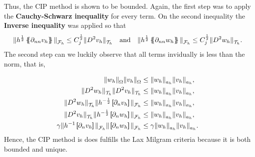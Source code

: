 Thus, the CIP method is shown to be bounded.
Again, the first step was to apply the \textbf{Cauchy-Schwarz inequality} for every term. On the second inequality the \textbf{Inverse inequality} was applied so that
\[
\| h^{\frac{1}{2}} \mean{ \partial _{nn}v_{h} }   \|_{ \mathcal{F} _{h}  }^{  }\le   C_{j}^{\frac{1}{2}} \| D ^2 v_{h} \|_{ \mathcal{T} _{h} }^{  } \quad \text{and} \quad   \| h^{\frac{1}{2}} \mean{ \partial _{nn}w_{h} }   \|_{ \mathcal{F} _{h}
}^{  }\le   C_{j}^{\frac{1}{2}} \| D ^2 w_{h} \|_{ \mathcal{T} _{h} }^{  }.
\]
The second step can we luckily observe that all terms invidually is less than the norm, that is,

\begin{equation}
\label{eq:bounded_ineq}
\begin{split}
\| w_{h} \|_{\Omega    }^{  }  \| v_{h} \|_{ \Omega    }^{  } & \le \| w_{h} \|_{ a_{h} }^{  } \| v_{h} \|_{ a_{h} }^{  }, \\
\| D ^2w_{h} \|_{\mathcal{T}_{h}   }^{  }  \| D ^2v_{h} \|_{\mathcal{T}_{h}   }^{  } & \le \| w_{h} \|_{ a_{h} }^{  } \| v_{h} \|_{ a_{h} }^{  }, \\
\|  D ^2 w_{h} \|_{ \mathcal{T} _{h} }^{ } \| h^{-\frac{1}{2}} \jump{ \partial _{n} v_{h} }   \|_{ \mathcal{F} _{h} }^{  }  & \le  \| w_{h} \|_{ a_{h} }^{  } \| v_{h} \|_{ a_{h} }^{  }, \\
   \|  D ^2 v_{h} \|_{ \mathcal{T} _{h} }^{ } \| h^{-\frac{1}{2}} \jump{ \partial _{n} w_{h} }   \|_{ \mathcal{F} _{h} }^{  }   & \le \| w_{h} \|_{ a_{h} }^{  } \| v_{h} \|_{ a_{h} }^{  }, \\
 \gamma \| h^{-1 } \jump{ \partial _{n} v_{h} }    \|_{ \mathcal{F} _{h}  }^{  }  \| \jump{ \partial _{n} w_{h} }    \|_{\mathcal{F}_{h}   }^{  }   & \le \gamma \| w_{h} \|_{ a_{h} }^{  }  \| v_{h} \|_{ a_{h} }^{  }.
\end{split}
\end{equation}
Hence, the CIP method is does fulfills the Lax Milgram criteria because it is both bounded and unique.

